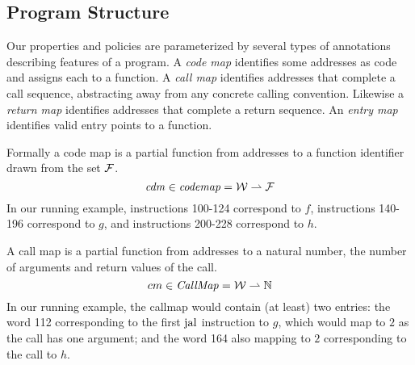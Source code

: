 \documentclass[acmsmall,review,anonymous]{acmart}\settopmatter{printfolios=true,printccs=false,printacmref=false}
\begin{document}

%




\subsection{Program Structure}

Our properties and policies are parameterized by several types of
annotations describing features of a program. A {\em code map}
identifies some addresses as code and assigns each to a function. A
{\em call map} identifies addresses that complete a call sequence,
abstracting away from any concrete calling convention. Likewise a {\em
  return map} identifies addresses that complete a return sequence. An
{\em entry map} identifies valid entry points to a function.

Formally a code map is a partial function from addresses to a function
identifier drawn from the set \(\mathcal{F}\).
\[\mathit{cdm} \in \mathit{codemap} = {\mathcal W} \rightharpoonup \mathcal{F}\]
%
In our running example, instructions 100-124 correspond to $f$,
instructions 140-196 correspond to $g$, and instructions 200-228
correspond to $h$.

A call map is a partial function from addresses to a natural number,
the number of arguments and return values of the call.
\[cm \in \mathit{CallMap} = {\mathcal W} \rightharpoonup \mathbb{N}\]
%
In our running example, the callmap would contain (at least) two
entries: the word 112 corresponding to the first $\text{jal}$
instruction to $g$, which would map to $2$ as the call has one
argument; and the word 164 also mapping to $2$ corresponding
to the call to $h$.
\end{document}
